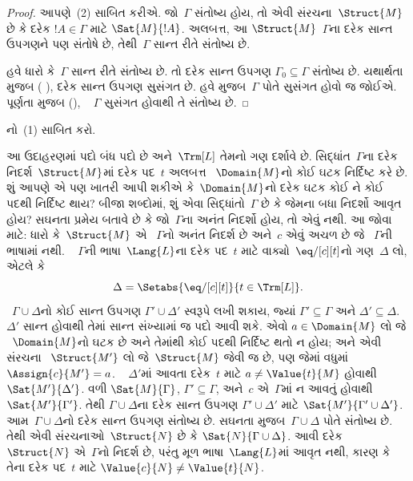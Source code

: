\begin{proof}
આપણે~(2) સાબિત કરીએ. જો~$\Gamma$ સંતોષ્ય હોય, તો એવી
સંરચના~$\Struct{M}$
છે કે દરેક $!A\in\Gamma$ માટે
$\Sat{M}{!A}$. અલબત્ત, આ
$\Struct{M}$~$\Gamma$ના દરેક સાન્ત ઉપગણને
પણ સંતોષે છે, તેથી~$\Gamma$ સાન્ત રીતે સંતોષ્ય છે.

હવે ધારો કે~$\Gamma$ સાન્ત રીતે સંતોષ્ય છે. તો દરેક સાન્ત ઉપગણ
$\Gamma_0\subseteq\Gamma$ સંતોષ્ય છે. યથાર્થતા મુજબ
(%
  ),
દરેક સાન્ત ઉપગણ સુસંગત છે. હવે
%
મુજબ~$\Gamma$ પોતે સુસંગત હોવો જ જોઈએ. પૂર્ણતા મુજબ
(), ~ $\Gamma$ સુસંગત હોવાથી તે સંતોષ્ય છે.
\end{proof}


\begin{prob}
નો~(1) સાબિત કરો.
\end{prob}




%
\begin{ex}
આ ઉદાહરણમાં પદો બંધ પદો છે અને~$\Trm[L]$ તેમનો ગણ દર્શાવે છે.
સિદ્ધાંત~$\Gamma$ના દરેક નિદર્શ~$\Struct{M}$માં દરેક પદ~$t$ અલબત્ત
~$\Domain{M}$નો કોઈ ઘટક નિર્દિષ્ટ કરે છે. શું આપણે એ પણ
ખાતરી આપી શકીએ કે~$\Domain{M}$નો દરેક ઘટક કોઈ ને કોઈ પદથી
નિર્દિષ્ટ થાય? બીજા શબ્દોમાં, શું એવા સિદ્ધાંતો~$\Gamma$ છે કે જેમના
બધા નિદર્શો આવૃત હોય? સઘનતા પ્રમેય બતાવે છે કે જો~$\Gamma$ના અનંત
નિદર્શો હોય, તો એવું નથી. આ જોવા માટે: ધારો કે~$\Struct{M}$ એ
~$\Gamma$નો અનંત નિદર્શ છે અને~$c$ એવું અચળ છે જે
~$\Gamma$ની ભાષામાં નથી. ~ $\Gamma$ની ભાષા~$\Lang{L}$ના દરેક પદ~$t$
માટે વાક્યો~$\eq/[c][t]$નો ગણ~$\Delta$ લો, એટલે કે
  \[
  \Delta = \Setabs{\eq/[c][t]}{t \in \Trm[L]}.
  \]
~$\Gamma\cup\Delta$નો કોઈ સાન્ત ઉપગણ $\Gamma'\cup\Delta'$ સ્વરૂપે
લખી શકાય, જ્યાં $\Gamma'\subseteq\Gamma$ અને
$\Delta'\subseteq\Delta$. ~ $\Delta'$ સાન્ત હોવાથી તેમાં સાન્ત
સંખ્યામાં જ પદો આવી શકે. એવો $a \in \Domain{M}$ લો જે
~$\Domain{M}$નો ઘટક છે અને તેમાંથી કોઈ પદથી નિર્દિષ્ટ થતો ન
હોય; અને એવી સંરચના
~$\Struct{M'}$ લો જે~$\Struct{M}$ જેવી જ છે, પણ જેમાં વધુમાં
$\Assign{c}{M'}=a$. ~ $\Delta'$માં આવતા દરેક~$t$ માટે
$a\neq\Value{t}{M}$ હોવાથી $\Sat{M'}{\Delta'}$. વળી
$\Sat{M}{\Gamma}$, $\Gamma'\subseteq\Gamma$, અને~$c$ એ~$\Gamma$માં
ન આવતું હોવાથી $\Sat{M'}{\Gamma'}$. તેથી
$\Gamma\cup\Delta$ના દરેક સાન્ત ઉપગણ $\Gamma'\cup\Delta'$ માટે
$\Sat{M'}{\Gamma'\cup\Delta'}$. આમ~$\Gamma\cup\Delta$નો દરેક સાન્ત
ઉપગણ સંતોષ્ય છે. સઘનતા મુજબ~$\Gamma\cup\Delta$ પોતે સંતોષ્ય છે.
તેથી એવી સંરચનાઓ~$\Struct{N}$ છે કે
$\Sat{N}{\Gamma\cup\Delta}$. આવી દરેક~$\Struct{N}$ એ~$\Gamma$નો
નિદર્શ છે, પરંતુ મૂળ ભાષા~$\Lang{L}$માં આવૃત નથી, કારણ કે તેના દરેક પદ~$t$ માટે
$\Value{c}{N}\neq\Value{t}{N}$.
\end{ex}

